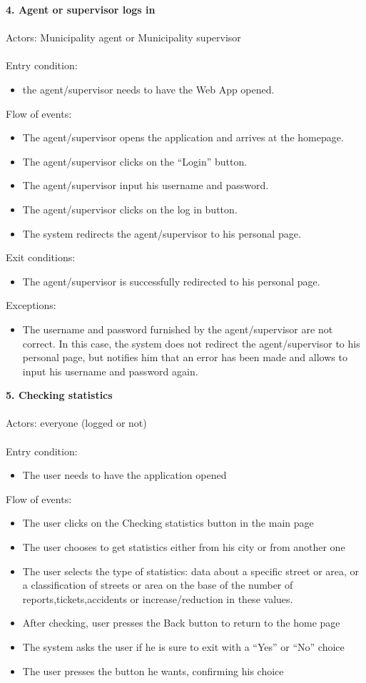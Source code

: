 \documentclass[a4paper]{report}
\begin{document}
\textbf{4. Agent or supervisor logs in }\label{uc:4}
\\
\\
Actors: Municipality agent or Municipality supervisor \\ \\
Entry condition:
\begin{itemize}
\item the agent/supervisor needs to have the Web App opened.
\end{itemize}
Flow of events:
\begin{itemize}
\item The agent/supervisor opens the application and arrives at the homepage.
\item The agent/supervisor clicks on the “Login” button.
\item The agent/supervisor input his username and password.
\item	The agent/supervisor clicks on the log in button.
\item	The system redirects the agent/supervisor to his personal page.
\end{itemize}
Exit conditions:
\begin{itemize}
\item The agent/supervisor is successfully redirected to his personal page.
 \end{itemize}
Exceptions: 
 \begin{itemize}
 \item The username and password furnished by the agent/supervisor are not correct. In this case, the system does not redirect the agent/supervisor to his personal page, but notifies him that an error has been made and allows to input his username and password again.
\end{itemize}
\textbf{5. Checking statistics}\label{uc:5}
\\ \\
Actors: everyone (logged or not) \\ \\
Entry condition: 
\begin{itemize}
\item The user needs to have the application opened
\end{itemize}
Flow of events:
\begin{itemize}
\item The user clicks on the Checking statistics button in the main page
\item The user chooses to get statistics either from his city or from another one
\item The user selects the type of statistics: data about a specific street or area, or a classification of streets or area on the base of the number of reports,tickets,accidents or increase/reduction in these values.
\item After checking, user presses the Back button to return to the home page
\item The system asks the user if he is sure to exit with a “Yes” or “No” choice
\item The user presses the button he wants, confirming his choice
\end{itemize}
\end{document}
